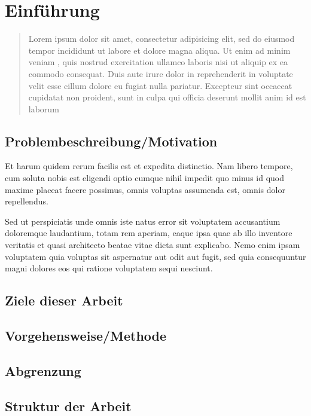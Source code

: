 \chapter{Einführung}
\begin{quote}
Lorem ipsum dolor sit amet, consectetur adipisicing elit, sed do eiusmod tempor incididunt ut labore et dolore magna aliqua. Ut enim ad minim veniam \cite{smith2020example} , quis nostrud exercitation ullamco laboris nisi ut aliquip ex ea commodo consequat. Duis aute irure dolor in reprehenderit in voluptate velit \cite{doe2019research}  esse cillum dolore eu fugiat nulla pariatur. Excepteur sint occaecat cupidatat non proident, sunt in culpa qui officia deserunt mollit anim id est laborum \cite{lee2018conference} 
\end{quote} 

\section{Problembeschreibung/Motivation}

Et harum quidem rerum facilis est et expedita distinctio. Nam libero tempore, cum soluta nobis est eligendi optio cumque nihil impedit quo minus id quod maxime placeat facere possimus, omnis voluptas assumenda est, omnis dolor repellendus.

Sed ut perspiciatis unde omnis iste natus error sit voluptatem accusantium doloremque laudantium, totam rem aperiam, eaque ipsa quae ab illo inventore \cite{miller2017chapter}  veritatis et quasi architecto beatae vitae dicta sunt explicabo. Nemo enim ipsam voluptatem quia voluptas sit aspernatur aut \cite{website2021example}  odit aut fugit, sed quia consequuntur magni dolores eos qui ratione voluptatem sequi nesciunt.

\section{Ziele dieser Arbeit}

\section{Vorgehensweise/Methode}

\section{Abgrenzung}

\section{Struktur der Arbeit}
